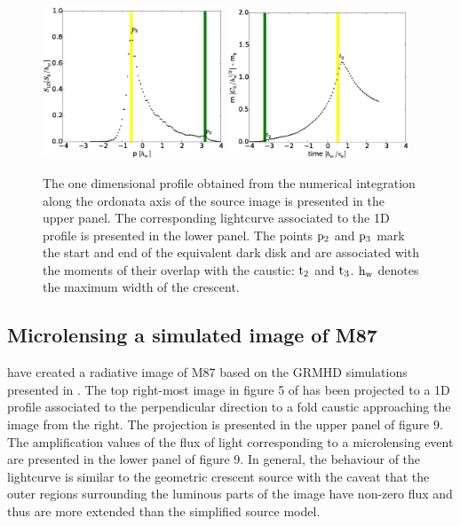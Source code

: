 \documentclass[usenatbib]{mn2e}
\begin{document}
\begin{figure}
\centering
    \includegraphics[width = 0.48\textwidth]{figures/M87_shape.eps}
        \includegraphics[width = 0.48\textwidth]{figures/M87_lc.eps}
\caption{\label{fig:M87_plots} The one dimensional profile obtained
  from the numerical integration along the ordonata axis of the source
  image is presented in the upper panel. The corresponding
  lightcurve associated to the 1D profile is presented in the lower
  panel. The points $\rm p_2$ and $\rm p_3$ mark the start and 
  end of the equivalent
  dark disk and are associated with the moments of their overlap with
  the caustic: $\rm t_2$ and $\rm t_3$. $\rm h_{w}$ denotes the maximum width of the crescent.}
\end{figure}


\subsection{Microlensing a simulated image of M87}

\cite{2012MNRAS.421.1517D} have created a radiative image of M87 based on the GRMHD simulations presented in \citep{2009MNRAS.394L.126M}. 
The top right-most image in figure 5 of \cite{2012MNRAS.421.1517D} has been projected to a 1D profile associated to the perpendicular 
direction to a fold caustic approaching the image from the right. The projection is presented in the upper panel of figure 9. 
The amplification values of the flux of light corresponding to a microlensing event are presented in the lower panel of figure 9. 
In general, the behaviour of the lightcurve is similar to the geometric crescent source with the caveat that the outer regions 
surrounding the luminous parts of the image have non-zero flux and thus are more extended than the simplified source model.
\end{document}
